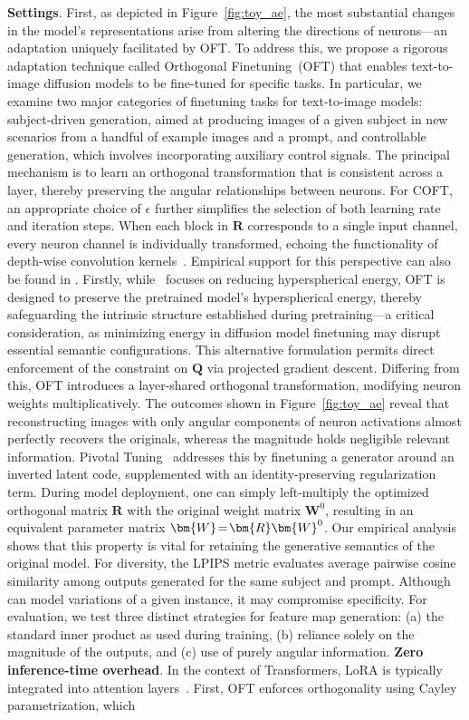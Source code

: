 {\textbf{Settings}. First, as depicted in Figure~\ref{fig:toy_ae}, the most substantial changes in the model’s representations arise from altering the directions of neurons—an adaptation uniquely facilitated by OFT. To address this, we propose a rigorous adaptation technique called Orthogonal Finetuning~(OFT) that enables text-to-image diffusion models to be fine-tuned for specific tasks. In particular, we examine two major categories of finetuning tasks for text-to-image models: subject-driven generation, aimed at producing images of a given subject in new scenarios from a handful of example images and a prompt, and controllable generation, which involves incorporating auxiliary control signals. The principal mechanism is to learn an orthogonal transformation that is consistent across a layer, thereby preserving the angular relationships between neurons. For COFT, an appropriate choice of $\epsilon$ further simplifies the selection of both learning rate and iteration steps. When each block in $\bm{R}$ corresponds to a single input channel, every neuron channel is individually transformed, echoing the functionality of depth-wise convolution kernels~\cite{chollet2017xception}. Empirical support for this perspective can also be found in \cite{liu2021orthogonal}. Firstly, while~\cite{liu2021orthogonal} focuses on reducing hyperspherical energy, OFT is designed to preserve the pretrained model’s hyperspherical energy, thereby safeguarding the intrinsic structure established during pretraining—a critical consideration, as minimizing energy in diffusion model finetuning may disrupt essential semantic configurations. This alternative formulation permits direct enforcement of the constraint on $\bm{Q}$ via projected gradient descent. Differing from this, OFT introduces a layer-shared orthogonal transformation, modifying neuron weights multiplicatively. The outcomes shown in Figure~\ref{fig:toy_ae} reveal that reconstructing images with only angular components of neuron activations almost perfectly recovers the originals, whereas the magnitude holds negligible relevant information. Pivotal Tuning~\cite{roich2022pivotal} addresses this by finetuning a generator around an inverted latent code, supplemented with an identity-preserving regularization term. During model deployment, one can simply left-multiply the optimized orthogonal matrix $\bm{R}$ with the original weight matrix $\bm{W}^0$, resulting in an equivalent parameter matrix $\thickmuskip=2mu \medmuskip=2mu \bm{W}=\bm{R}\bm{W}^0$. Our empirical analysis shows that this property is vital for retaining the generative semantics of the original model. For diversity, the LPIPS metric evaluates average pairwise cosine similarity among outputs generated for the same subject and prompt. Although~\cite{casanova2021instance} can model variations of a given instance, it may compromise specificity. For evaluation, we test three distinct strategies for feature map generation: (a) the standard inner product as used during training, (b) reliance solely on the magnitude of the outputs, and (c) use of purely angular information. \textbf{Zero inference-time overhead}. In the context of Transformers, LoRA is typically integrated into attention layers~\cite{hulora2022}. First, OFT enforces orthogonality using Cayley parametrization, which }
